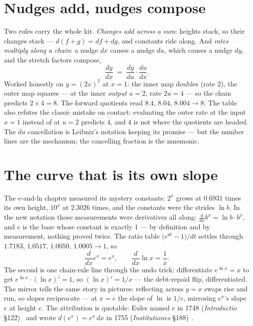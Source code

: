 \begin{narrative}
\section{Nudges add, nudges compose}

Two rules carry the whole kit. \emph{Changes add across a sum}:
heights stack, so their changes stack —
$d(f + g) = df + dg$, and constants ride along. And \emph{rates
multiply along a chain}: a nudge $dx$ causes a nudge $du$, which
causes a nudge $dy$, and the stretch factors compose,
\[
  \frac{dy}{dx} \;=\; \frac{dy}{du} \cdot \frac{du}{dx} .
\]
Worked honestly on $y = (2x)^2$ at $x = 1$: the inner map doubles
(rate $2$), the outer map squares — at the inner \emph{output}
$u = 2$, rate $2u = 4$ — so the chain predicts $2 \times 4 = 8$. The
forward quotients read $8.4$, $8.04$, $8.004 \to 8$. The table also
refutes the classic mistake on contact: evaluating the outer rate at
the input $x = 1$ instead of at $u = 2$ predicts $4$, and $4$ is not
where the quotients are headed. The $du$ cancellation is Leibniz's
notation keeping its promise — but the number lines are the
mechanism; the cancelling fraction is the mnemonic.

\section{The curve that is its own slope}

The e-and-ln chapter measured its mystery constants: $2^x$ grows at
$0.6931$ times its own height, $10^x$ at $2.3026$ times, and the
constants were the strides $\ln b$. In the new notation those
measurements were derivatives all along:
$\frac{d}{dx} b^x = \ln b \cdot b^x$, and $e$ is the base whose
constant is exactly $1$ — by definition and by measurement, nothing
proved twice. The ratio table $\bigl(e^{dt} - 1\bigr)/dt$ settles
through $1.7183$, $1.0517$, $1.0050$, $1.0005 \to 1$, so
\[
  \frac{d}{dx} e^x = e^x,
  \qquad
  \frac{d}{dx} \ln x = \frac{1}{x} .
\]
The second is one chain-rule line through the undo trick: differentiate
$e^{\ln x} = x$ to get $e^{\ln x} \cdot (\ln x)' = 1$, so
$(\ln x)' = 1/x$ — the debt-repaid flip, differentiated. The mirror
tells the same story in pictures: reflecting across $y = x$ swaps
rise and run, so slopes reciprocate — at $x = e$ the slope of
$\ln$ is $1/e$, mirroring $e^x$'s slope $e$ at height $e$. The
attribution is quotable: Euler named $e$ in 1748 (\emph{Introductio}
\S122)~\cite{calculus-leonhard-euler-introductio-in-analysin-infinitorum-i-vii-bru}
and wrote $d(e^x) = e^x\,dx$ in 1755 (\emph{Institutiones}
\S188)~\cite{calculus-leonhard-euler-institutiones-calculi-differentialis-i-vi-bru}.


\end{narrative}
